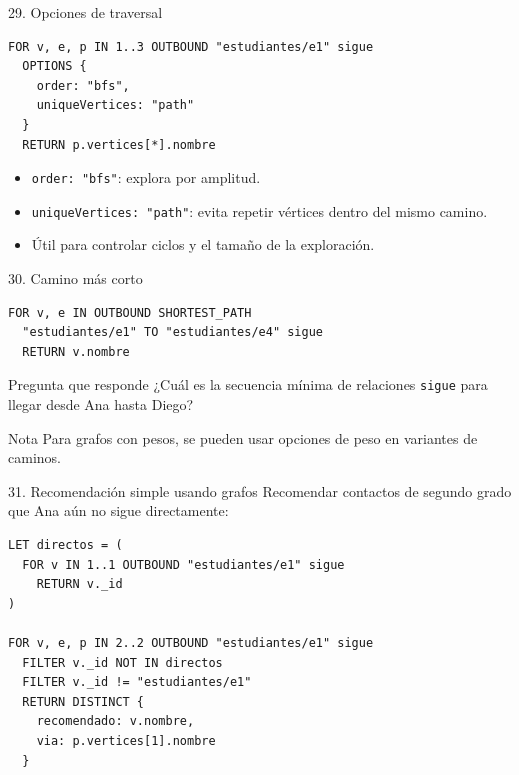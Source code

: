 \documentclass[aspectratio=169,11pt]{beamer}
\begin{document}
\begin{frame}[fragile]{29. Opciones de traversal}
\begin{lstlisting}
FOR v, e, p IN 1..3 OUTBOUND "estudiantes/e1" sigue
  OPTIONS {
    order: "bfs",
    uniqueVertices: "path"
  }
  RETURN p.vertices[*].nombre
\end{lstlisting}

\vspace{0.2cm}
\begin{itemize}
  \item \texttt{order: "bfs"}: explora por amplitud.
  \item \texttt{uniqueVertices: "path"}: evita repetir vértices dentro del mismo camino.
  \item Útil para controlar ciclos y el tamaño de la exploración.
\end{itemize}
\end{frame}

\begin{frame}[fragile]{30. Camino más corto}
\begin{lstlisting}
FOR v, e IN OUTBOUND SHORTEST_PATH
  "estudiantes/e1" TO "estudiantes/e4" sigue
  RETURN v.nombre
\end{lstlisting}

\vspace{0.2cm}
\begin{block}{Pregunta que responde}
¿Cuál es la secuencia mínima de relaciones \texttt{sigue} para llegar desde Ana hasta Diego?
\end{block}

\begin{alertblock}{Nota}
Para grafos con pesos, se pueden usar opciones de peso en variantes de caminos.
\end{alertblock}
\end{frame}

\begin{frame}[fragile]{31. Recomendación simple usando grafos}
Recomendar contactos de segundo grado que Ana aún no sigue directamente:

\begin{lstlisting}
LET directos = (
  FOR v IN 1..1 OUTBOUND "estudiantes/e1" sigue
    RETURN v._id
)

FOR v, e, p IN 2..2 OUTBOUND "estudiantes/e1" sigue
  FILTER v._id NOT IN directos
  FILTER v._id != "estudiantes/e1"
  RETURN DISTINCT {
    recomendado: v.nombre,
    via: p.vertices[1].nombre
  }
\end{lstlisting}
\end{frame}
\end{document}
